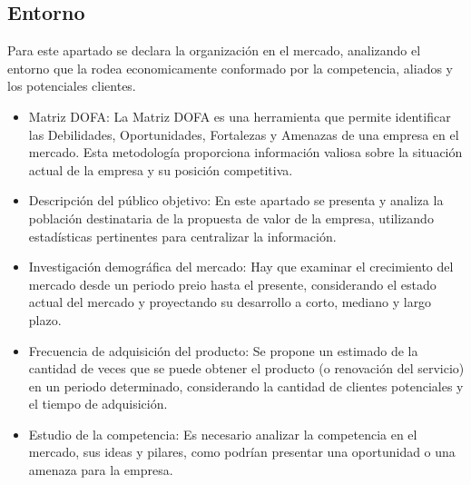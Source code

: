   \subsection{Entorno}
    Para este apartado se declara la organización en el mercado, analizando el entorno que la rodea economicamente conformado por la competencia, aliados y los potenciales clientes.
    \begin{itemize}
        \item Matriz DOFA:  La Matriz DOFA es una herramienta que permite identificar las Debilidades, Oportunidades, Fortalezas y Amenazas de una empresa en el mercado. Esta metodología proporciona información valiosa sobre la situación actual de la empresa y su posición competitiva.
        \item Descripción del público objetivo: En este apartado se presenta y analiza la población destinataria de la propuesta de valor de la empresa, utilizando estadísticas pertinentes para centralizar la información.
        \item Investigación demográfica del mercado: Hay que examinar el crecimiento del mercado desde un periodo preio hasta el presente, considerando el estado actual del mercado y proyectando su desarrollo a corto, mediano y largo plazo.
        \item Frecuencia de adquisición del producto: Se propone un estimado de la cantidad de veces que se puede obtener el producto (o renovación del servicio) en un periodo determinado, considerando la cantidad de clientes potenciales y el tiempo de adquisición.
        \item Estudio de la competencia: Es necesario analizar la competencia en el mercado, sus ideas y pilares, como podrían presentar una oportunidad o una amenaza para la empresa.
    \end{itemize}
